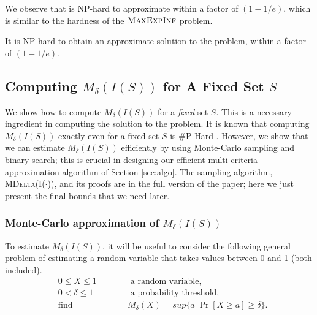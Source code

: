 We observe that \infprob{} is NP-hard to approximate within a factor of $(1-1/e)$, which is similar to the hardness of the $\textsc{MaxExpInf}$ problem.

\begin{lemma}
\label{lemma:hardness}
It is NP-hard to obtain an approximate solution to the \infprob{} problem, within a factor of $(1-1/e)$.
\end{lemma}

\vspace{-0.05in}
\subsection{Computing $M_{\delta}(I(S))$ for A Fixed Set $S$}
\label{sec:sampling}

We show how to compute $M_{\delta}(I(S))$ for a {\em fixed} set $S$. This is a necessary ingredient
in computing the solution to the \infprob{} problem.
It is known that computing $M_{\delta}(I(S))$ exactly even for a fixed set $S$ is \#P-Hard \cite{zhang:kdd14}.
However, we show that we can estimate $M_{\delta}(I(S))$ efficiently
by using Monte-Carlo sampling and binary search; this is crucial in designing our efficient
multi-criteria approximation algorithm of Section \ref{sec:algo}.
The sampling algorithm, \textsc{MDelta(I($\cdot$))}, and its proofs are in the full version of the paper;
here we just present the final bounds that we need later.

\iffalse
\subsubsection{Monte-Carlo approximation of $M_{\delta}(I(S))$}
To estimate $M_{\delta}(I(S))$, it will be useful to consider the following general problem of estimating
a random variable that takes values between 0 and 1 (both included).
\begin{equation}
\begin{alignedat}{2}
  & 0 \leq X \leq 1 && \text{ a random variable} ,\\
  & 0 < \delta \leq 1 && \text{ a probability threshold} ,\\
  & \text{find} & \qquad & M_{\delta}(X) = sup\{a | \Pr[X \geq a] \geq \delta \}.
\end{alignedat}
\end{equation}

